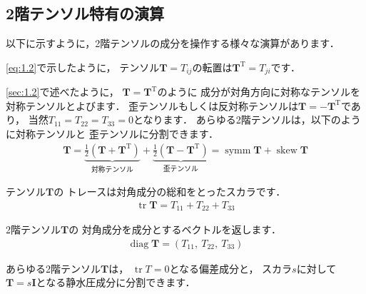 \subsection{2階テンソル特有の演算}
\label{ssec:1.3.9}
以下に示すように，2階テンソルの成分を操作する様々な演算があります．
\begin{description}
%
 \item[転置] \autoref{eq:1.2}で示したように，
            テンソル$\bm{T} = T_{ij}$の転置は$\bm{T}^{\mathrm{T}} = T_{ji}$です．
 \item[対称テンソルと歪（反対称）テンソル] \autoref{sec:1.2}で述べたように，
            $\bm{T} = \bm{T}^{\mathrm{T}}$のように
            成分が対角方向に対称なテンソルを
%
対称テンソルとよびます．
            歪テンソルもしくは反対称テンソルは$\bm{T} = -\bm{T}^{\mathrm{T}}$であり，
            当然$T_{11} = T_{22} = T_{33} = 0$となります．
            あらゆる2階テンソルは，以下のように対称テンソルと
%
歪テンソルに分割できます．
            \begin{align}
             \label{eq:1.31}
             \bm{T} = \underbrace{\frac{1}{2}(\bm{T} + \bm{T}^{\mathrm{T}})}_{\text{対称テンソル}}
             + \underbrace{\frac{1}{2}(\bm{T} - \bm{T}^{\mathrm{T}})}_{\text{歪テンソル}}
             = \mathop{\mathrm{symm}}\bm{T} + \mathop{\mathrm{skew}}\bm{T}
            \end{align}
 \item[トレース] テンソル$\bm{T}$の
%
トレースは対角成分の総和をとったスカラです．
            \begin{align}
             \label{eq:1.32}
             \mathop{\mathrm{tr}}\bm{T} = T_{11} + T_{22} + T_{33}
            \end{align}
 \item[対角] 2階テンソル$\bm{T}$の
%
対角成分を成分とするベクトルを返します．
            \begin{align}
             \label{eq:1.33}
             \mathop{\mathrm{diag}}\bm{T} = (T_{11},\ T_{22},\ T_{33})
            \end{align}
 \item[偏差テンソルと静水圧テンソル] あらゆる2階テンソル$\bm{T}$は，
            $\mathop{\mathrm{tr}}T = 0$となる偏差成分と，
            スカラ$s$に対して$\bm{T} = s\bm{I}$となる静水圧成分に分割できます．

\end{description}
